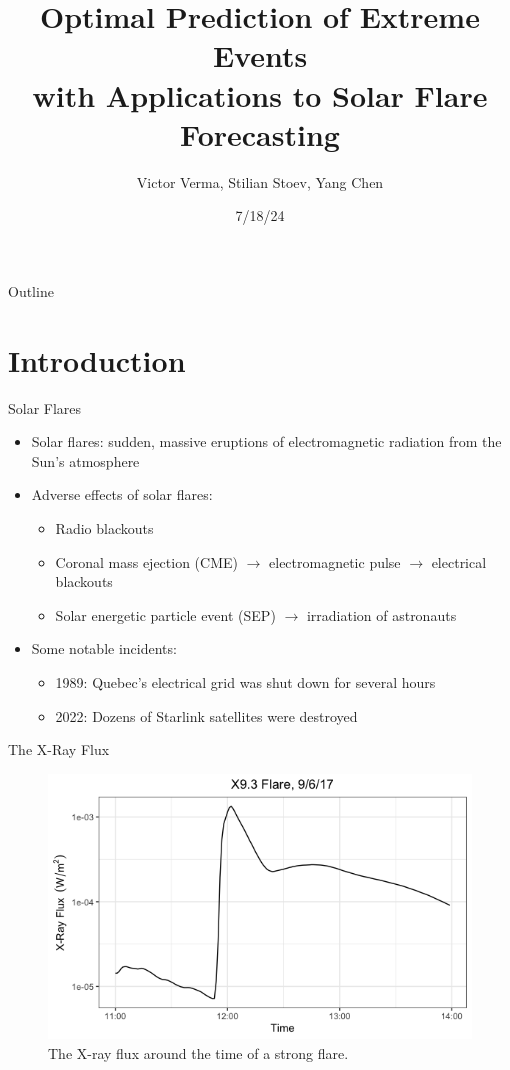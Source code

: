 \documentclass{beamer}
\title[Optimal Prediction of Extreme Events]{Optimal Prediction of Extreme Events \\ with Applications to Solar Flare Forecasting}
\author{Victor Verma, Stilian Stoev, Yang Chen}
\institute[]
{
Department of Statistics \\
University of Michigan
}
\date[7/18/24]{7/18/24}
\begin{document}
\begin{frame}
    \titlepage
\end{frame}

\begin{frame}{Outline}
   \tableofcontents
\end{frame}

\section{Introduction}

\begin{frame}{Solar Flares}
    \begin{itemize}
        \item Solar flares: sudden, massive eruptions of electromagnetic radiation from the Sun's atmosphere
        \item Adverse effects of solar flares: 
        \begin{itemize}
            \item Radio blackouts
            \item Coronal mass ejection (CME) $\rightarrow$ electromagnetic pulse $\rightarrow$ electrical blackouts
            \item Solar energetic particle event (SEP) $\rightarrow$ irradiation of astronauts
        \end{itemize}
        \item Some notable incidents:
        \begin{itemize}
            \item 1989: Quebec's electrical grid was shut down for several hours
            \item 2022: Dozens of Starlink satellites were destroyed
        \end{itemize}
    \end{itemize}
\end{frame}

\begin{frame}{The X-Ray Flux}
    \begin{figure}
        \centering
        \includegraphics[scale=0.5]{flare_flux_example.png}
        \caption{The X-ray flux around the time of a strong flare.}
        \label{fig:flare_flux_example}
    \end{figure}
\end{frame}
\end{document}
